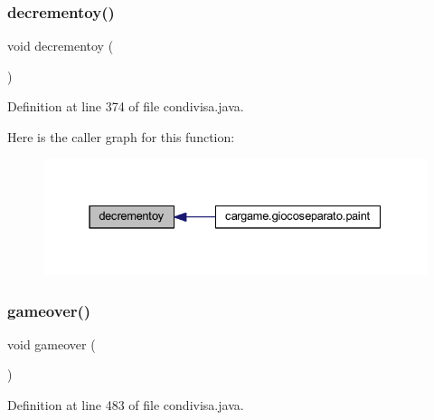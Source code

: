 \subsubsection{\texorpdfstring{decrementoy()}{decrementoy()}}
{\footnotesize\ttfamily void decrementoy (\begin{DoxyParamCaption}{ }\end{DoxyParamCaption})}



Definition at line 374 of file condivisa.\+java.

Here is the caller graph for this function\+:
\nopagebreak
\begin{figure}[H]
\begin{center}
\leavevmode
\includegraphics[width=331pt]{classcargame_1_1condivisa_ad92dcd19309e0721961bc42f9ed605ed_icgraph}
\end{center}
\end{figure}
\mbox{\label{classcargame_1_1condivisa_a66865cebbc04c361135576c98005b741}} 
\subsubsection{\texorpdfstring{gameover()}{gameover()}}
{\footnotesize\ttfamily void gameover (\begin{DoxyParamCaption}{ }\end{DoxyParamCaption})}



Definition at line 483 of file condivisa.\+java.

